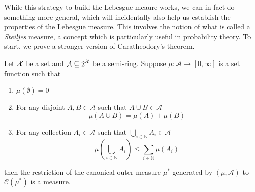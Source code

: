 While this strategy to build the Lebesgue meaure works, we can in
fact do something more general, which will incidentally also help
us establish the properties of the Lebesgue measure. This involves
the notion of what is called a \emph{Steiljes }measure, a concept
which is particularly useful in probability theory. To start, we prove
a stronger version of Caratheodory's theorem.
\begin{thm}
\label{thm:semiRingCaratheodoryExtn}Let $\mathcal{X}$ be a set and $\mathcal{A}\subseteq2^{\mathcal{X}}$
be a semi-ring. Suppose $\mu:\mathcal{A}\longrightarrow\left[0,\infty\right]$
is a set function such that

\begin{enumerate}[label=(\roman*),leftmargin=.1\linewidth,rightmargin=.4\linewidth]
	\item $\mu\left(\emptyset\right) = 0 $
	\item  For any disjoint $A,B \in \mathcal{A}$ such that $A\cup B \in \mathcal{A}$
	\[
			\mu\left(A\cup B\right) = \mu\left(A\right) + \mu\left(B\right)
	\]
	\item For any collection $A_i \in \mathcal{A}$ such that $\bigcup_{i\in \mathds{N}} A_i \in \mathcal{A}$
	\[
		\mu\left(\bigcup_{i\in\mathds{N}} A_i \right) \leq \sum_{i \in \mathds{N}} \mu \left(A_i\right)
	\]
\end{enumerate}then the restriction of the canonical outer measure $\mu^{*}$ generated
by $\left(\mu,\mathcal{A}\right)$ to $\mathcal{C}\left(\mu^{*}\right)$
is a measure.
\end{thm}

